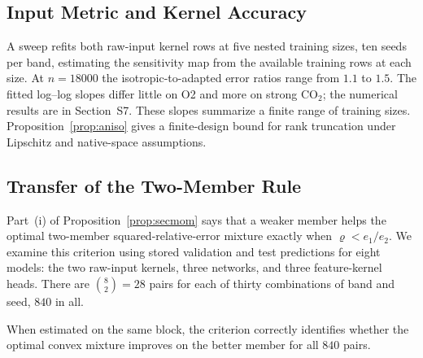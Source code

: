 \documentclass[twoside,11pt]{article}
\begin{document}
\subsection{Input Metric and Kernel Accuracy}
\label{sec:aniso-measured}
A sweep refits both raw-input kernel rows at five nested
training sizes, ten seeds per band, estimating the sensitivity map from
the available training rows at each size. At $n=18000$ the isotropic-to-adapted
error ratios range from $1.1$ to $1.5$. The fitted log--log slopes differ
little on O2 and more on strong CO$_2$; the numerical results are in
Section~S7. These slopes summarize a finite range of training sizes.
Proposition~\ref{prop:aniso} gives a finite-design bound for rank
truncation under Lipschitz and native-space assumptions.
\subsection{Transfer of the Two-Member Rule}
\label{sec:secmom-margin}
Part~(i) of Proposition~\ref{prop:secmom} says that a weaker member helps
the optimal two-member squared-relative-error mixture exactly when
$\varrho<e_1/e_2$. We examine this criterion using stored
validation and test predictions for eight models: the two raw-input
kernels, three networks, and three feature-kernel heads. There are
$\binom{8}{2}=28$ pairs for each of thirty combinations of band and seed, $840$ in all.

When estimated on the same block, the criterion correctly identifies
whether the optimal convex mixture improves on the better member for all $840$ pairs.
\end{document}
